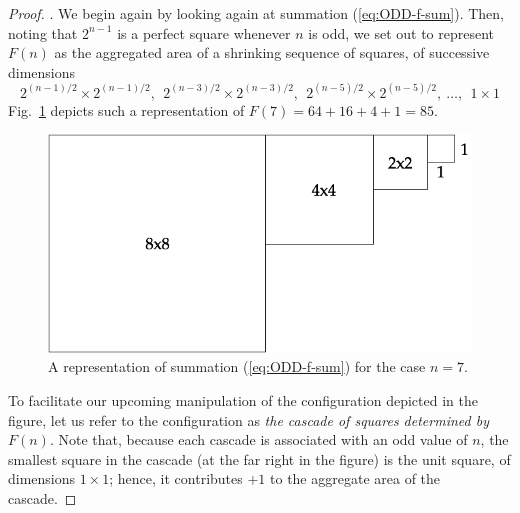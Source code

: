 \begin{proof}
.
We begin again by looking again at summation (\ref{eq:ODD-f-sum}).
Then, noting that $2^{n-1}$ is a perfect square whenever $n$ is odd,
we set out to represent $F(n)$ as the aggregated area of a shrinking
sequence of squares, of successive dimensions
\[ 2^{(n-1)/2} \times 2^{(n-1)/2}, \ \ 2^{(n-3)/2} \times 2^{(n-3)/2},
\ \ 2^{(n-5)/2} \times 2^{(n-5)/2}, \
\ldots, \ \  1 \times 1
\]
Fig.~\ref{fig:alternatePowers2odd} depicts such a representation of
$F(7) = 64+16+4+1 = 85$.
\begin{figure} [htb]
\begin{center}
        \includegraphics[scale=0.35]{FiguresMaths/alternatePowers2initOdd.png}
\caption{A representation of summation (\ref{eq:ODD-f-sum}) for the case $n=7$.}
        \label{fig:alternatePowers2odd}
\end{center}
\end{figure}
To facilitate our upcoming manipulation of the configuration depicted
in the figure, let us refer to the configuration as {\it the cascade
  of squares determined by $F(n)$}.  Note that, because each cascade
is associated with an odd value of $n$, the smallest square in the
cascade (at the far right in the figure) is the unit square, of
dimensions $1 \times 1$; hence, it contributes $+1$ to the aggregate
area of the cascade.


\end{proof}
